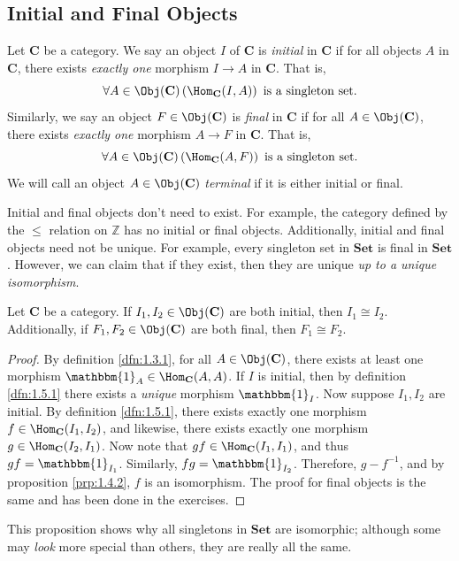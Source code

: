 \subsection{Initial and Final Objects}
\begin{definition}\label{dfn:1.5.1}
	Let $\mathbf{C}$ be a category. We say an object $I$ of $\mathbf{C}$ is \emph{initial} in $\mathbf{C}$ if for all objects $A$ in $\mathbf{C}$, there exists \emph{exactly one} morphism $I\to A$ in $\mathbf{C}$. That is,
	\[
		\forall A\in \Obj( \mathbf{C} ) \left( \Hom_{ \mathbf{C} }(I , A)  \right) \text{ is a singleton set}
	.\]
	Similarly, we say an object $F\in \Obj( \mathbf{C} ) $ is \emph{final} in $\mathbf{C}$ if for all $A\in \Obj( \mathbf{C} ) $, there exists \emph{exactly one} morphism $A\to F$ in $\mathbf{C}$. That is,
	\[
		\forall A\in \Obj( \mathbf{C} ) \left( \Hom_{ \mathbf{C} }(A , F)  \right) \text{ is a singleton set}
	.\]
	We will call an object $A\in \Obj( \mathbf{C} ) $ \emph{terminal} if it is either initial or final.
\end{definition}
Initial and final objects don't need to exist. For example, the category defined by the $\leq $ relation on $\mathbb{Z}$ has no initial or final objects. Additionally, initial and final objects need not be unique. For example, every singleton set in $\mathbf{Set}$ is final in $\mathbf{Set}$. However, we can claim that if they exist, then they are unique \emph{up to a unique isomorphism}.
\begin{proposition}\label{prp:1.5.1}
	Let $\mathbf{C}$ be a category. If $I_1,I_2\in \Obj( \mathbf{C} ) $ are both initial, then $I_1\cong I_2$. Additionally, if $F_1,F_2\in \Obj( \mathbf{C} ) $ are both final, then $F_1\cong F_2$.
\end{proposition}
\begin{proof}
	By definition \ref{dfn:1.3.1}, for all $A\in \Obj( \mathbf{C} ) $, there exists at least one morphism $\mathbbm{1}_{A} \in \Hom_{ \mathbf{C} }(A , A) $. If $I$ is initial, then by definition \ref{dfn:1.5.1} there exists a \emph{unique} morphism $\mathbbm{1}_{I} $. Now suppose $I_1,I_2$ are initial. By definition \ref{dfn:1.5.1}, there exists exactly one morphism $f\in \Hom_{ \mathbf{C} }(I_1 , I_2) $, and likewise, there exists exactly one morphism $g\in \Hom_{ \mathbf{C} }(I_2 , I_1) $. Now note that $gf\in \Hom_{ \mathbf{C} }(I_1 , I_1) $, and thus $gf=\mathbbm{1}_{I_1} $. Similarly, $fg=\mathbbm{1}_{I_2} $. Therefore, $g-f^{-1}$, and by proposition \ref{prp:1.4.2}, $f$ is an isomorphism. The proof for final objects is the same and has been done in the exercises.
\end{proof}
This proposition shows why all singletons in $\mathbf{Set}$ are isomorphic; although some may \emph{look} more special than others, they are really all the same.
